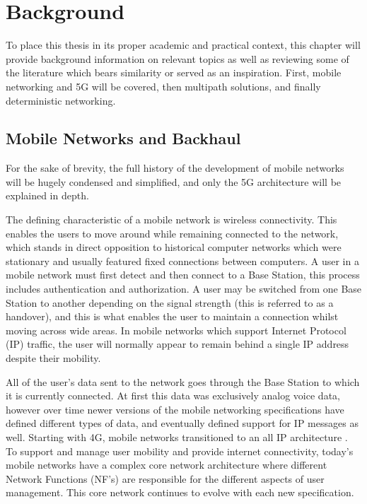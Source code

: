 
\cleardoublepage
\chapter{Background}
\label{cha:background}

To place this thesis in its proper academic and practical context, this chapter will provide background information on relevant topics as well as reviewing some of the literature which bears similarity or served as an inspiration. First, mobile networking and 5G will be covered, then multipath solutions, and finally deterministic networking.

\section{Mobile Networks and Backhaul}

For the sake of brevity, the full history of the development of mobile networks will be hugely condensed and simplified, and only the 5G architecture will be explained in depth.

The defining characteristic of a mobile network is wireless connectivity. This enables the users to move around while remaining connected to the network, which stands in direct opposition to historical computer networks which were stationary and usually featured fixed connections between computers. A user in a mobile network must first detect and then connect to a Base Station, this process includes authentication and authorization. A user may be switched from one Base Station to another depending on the signal strength (this is referred to as a handover), and this is what enables the user to maintain a connection whilst moving across wide areas. In mobile networks which support Internet Protocol (IP) traffic, the user will normally appear to remain behind a single IP address despite their mobility.

All of the user's data sent to the network goes through the Base Station to which it is currently connected. At first this data was exclusively analog voice data, however over time newer versions of the mobile networking specifications have defined different types of data, and eventually defined support for IP messages as well. Starting with 4G, mobile networks transitioned to an all IP architecture \cite{3gpp.36.300}. To support and manage user mobility and provide internet connectivity, today's mobile networks have a complex core network architecture where different Network Functions (NF's) are responsible for the different aspects of user management. This core network continues to evolve with each new specification.

